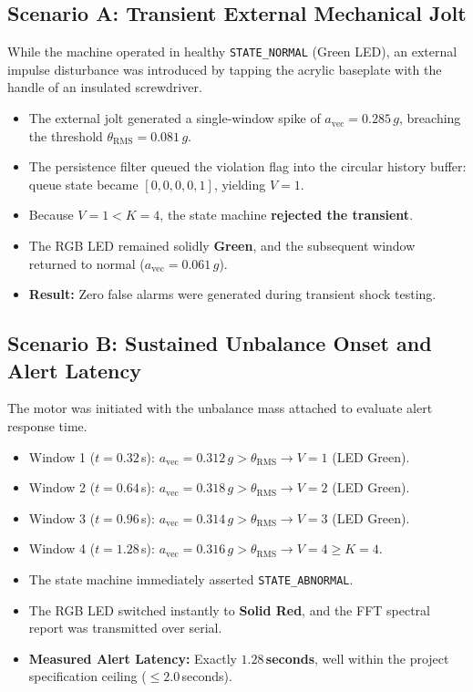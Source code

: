 \subsection{Scenario A: Transient External Mechanical Jolt}
While the machine operated in healthy \texttt{STATE\_NORMAL} (Green LED), an external impulse disturbance was introduced by tapping the acrylic baseplate with the handle of an insulated screwdriver.
\begin{itemize}
    \item The external jolt generated a single-window spike of $a_{\mathrm{vec}} = 0.285\,g$, breaching the threshold $\theta_{\mathrm{RMS}} = 0.081\,g$.
    \item The persistence filter queued the violation flag into the circular history buffer: queue state became $[0, 0, 0, 0, 1]$, yielding $V = 1$.
    \item Because $V = 1 < K = 4$, the state machine \textbf{rejected the transient}.
    \item The RGB LED remained solidly \textbf{Green}, and the subsequent window returned to normal ($a_{\mathrm{vec}} = 0.061\,g$).
    \item \textbf{Result:} Zero false alarms were generated during transient shock testing.
\end{itemize}

\subsection{Scenario B: Sustained Unbalance Onset and Alert Latency}
The motor was initiated with the unbalance mass attached to evaluate alert response time.
\begin{itemize}
    \item Window 1 ($t = 0.32$\,s): $a_{\mathrm{vec}} = 0.312\,g > \theta_{\mathrm{RMS}} \rightarrow V = 1$ (LED Green).
    \item Window 2 ($t = 0.64$\,s): $a_{\mathrm{vec}} = 0.318\,g > \theta_{\mathrm{RMS}} \rightarrow V = 2$ (LED Green).
    \item Window 3 ($t = 0.96$\,s): $a_{\mathrm{vec}} = 0.314\,g > \theta_{\mathrm{RMS}} \rightarrow V = 3$ (LED Green).
    \item Window 4 ($t = 1.28$\,s): $a_{\mathrm{vec}} = 0.316\,g > \theta_{\mathrm{RMS}} \rightarrow V = 4 \ge K = 4$.
    \item The state machine immediately asserted \texttt{STATE\_ABNORMAL}.
    \item The RGB LED switched instantly to \textbf{Solid Red}, and the FFT spectral report was transmitted over serial.
    \item \textbf{Measured Alert Latency:} Exactly \textbf{$1.28$\,seconds}, well within the project specification ceiling ($\le 2.0$\,seconds).
\end{itemize}


